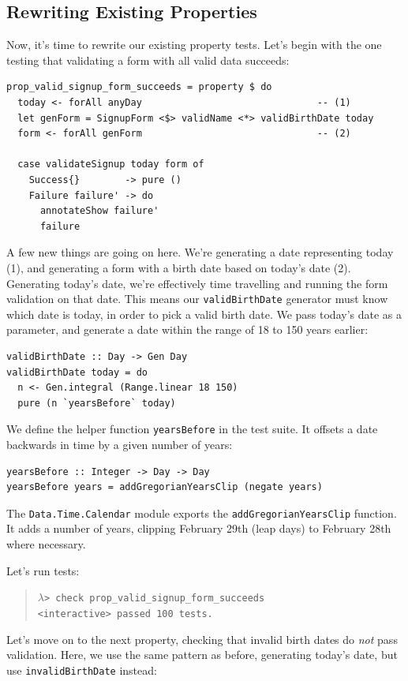 \subsection{Rewriting Existing
Properties}
\label{rewriting-existing-properties}

Now, it's time to rewrite our existing property tests. Let's begin with
the one testing that validating a form with all valid data succeeds:

\begin{verbatim}
prop_valid_signup_form_succeeds = property $ do
  today <- forAll anyDay                               -- (1)
  let genForm = SignupForm <$> validName <*> validBirthDate today
  form <- forAll genForm                               -- (2)

  case validateSignup today form of
    Success{}        -> pure ()
    Failure failure' -> do
      annotateShow failure'
      failure
\end{verbatim}
A few new things are going on here. We're generating a date representing
today (1), and generating a form with a birth date based on today's date
(2). Generating today's date, we're effectively time travelling and
running the form validation on that date. This means our
\texttt{validBirthDate} generator must know which date is today, in
order to pick a valid birth date. We pass today's date as a parameter,
and generate a date within the range of 18 to 150 years earlier:

\begin{verbatim}
validBirthDate :: Day -> Gen Day
validBirthDate today = do
  n <- Gen.integral (Range.linear 18 150)
  pure (n `yearsBefore` today)
\end{verbatim}
We define the helper function \texttt{yearsBefore} in the test suite. It
offsets a date backwards in time by a given number of years:

\begin{verbatim}
yearsBefore :: Integer -> Day -> Day
yearsBefore years = addGregorianYearsClip (negate years)
\end{verbatim}
The \texttt{Data.Time.Calendar} module exports the
\texttt{addGregorianYearsClip} function. It adds a number of years,
clipping February 29th (leap days) to February 28th where necessary.

Let's run tests:

\begin{quote}
$\lambda$\verb|> check prop_valid_signup_form_succeeds| \\
  \hspace*{1cm}\checkmark \verb|<interactive> passed 100 tests.|
\end{quote}
Let's move on to the next property, checking that invalid birth dates do
\emph{not} pass validation. Here, we use the same pattern as before,
generating today's date, but use \texttt{invalidBirthDate} instead:

